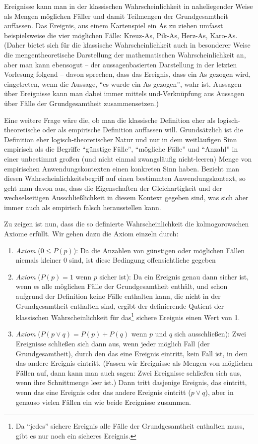 Ereignisse kann man in der klassischen Wahrscheinlichkeit in naheliegender
Weise als Mengen möglichen Fäller und damit Teilmengen der Grundgesamtheit
auffassen. Das Ereignis, aus einem Kartenspiel ein As zu ziehen umfasst
beispielsweise die vier möglichen Fälle: Kreuz-As, Pik-As, Herz-As, Karo-As.
(Daher bietet sich für die klassische Wahrscheinlichkeit auch in besonderer
Weise die mengentheoretische Darstellung der mathematischen Wahrscheinlichkeit
an, aber man kann ebensogut -- der aussagenbasierten Darstellung in der letzten
Vorlesung folgend -- davon sprechen, dass das Ereignis, dass ein As gezogen
wird, eingetreten, wenn die Aussage, "`es wurde ein As gezogen"', wahr ist.
Aussagen über Ereignisse kann man dabei immer mittels und-Verknüpfung aus
Aussagen über Fälle der Grundgesamtheit zusammensetzen.)

Eine weitere Frage wäre die, ob man die klassische Definition eher als
logisch-theoretische oder als empirische Definition auffassen will. Grundsätzlich
ist die Definition eher logisch-theoretischer Natur und nur in dem weitläufigen
Sinn empirisch als die Begriffe "`günstige Fälle"', "`mögliche Fälle"' und
"`Anzahl"' in einer unbestimmt großen (und nicht einmal zwangsläufig
nicht-leeren) Menge von empirischen Anwendungskontexten einen konkreten Sinn
haben. Bezieht man diesen Wahrscheinlichkeitsbegriff auf einen bestimmten
Anwendungskontext, so geht man davon aus, dass die Eigenschaften der
Gleichartigkeit und der wechselseitigen Ausschließlichkeit in diesem Kontext
gegeben sind, was sich aber immer auch als empirisch falsch herausstellen kann.

Zu zeigen ist nun, dass die so definierte Wahrscheinlichkeit die
kolmogorowschen Axiome erfüllt. Wir gehen dazu die Axiom einzeln durch:

\begin{enumerate}
\item {\em Axiom} ($0 \leq P(p)$): Da die Anzahlen von günstigen oder möglichen
Fällen niemals kleiner 0 sind, ist diese Bedingung offensichtliche gegeben
\item {\em Axiom} ($P(p)=1$ wenn $p$ sicher ist): Da ein Ereignis genau dann
sicher ist, wenn es alle möglichen Fälle der Grundgesamtheit enthält, und
schon aufgrund der Definition keine Fälle enthalten kann, die nicht in der
Grundgesamtheit enthalten sind, ergibt der definierende Qutient der klassischen
Wahrscheinlichkeit für das\footnote{Da "`jedes"' sichere Ereignis alle Fälle
der Grundgesamtheit enthalten muss, gibt es nur noch ein sicheres Ereignis.}
sichere Ereignis einen Wert von 1. 
\item {\em Axiom} ($P(p \vee q) = P(p) + P(q)$ wenn $p$ und $q$ sich
ausschließen): Zwei Ereignisse schließen sich dann aus, wenn jeder möglich Fall
(der Grundgesamtheit), durch den das eine Ereignis eintritt, kein Fall ist, in
dem das andere Ereignis eintritt. (Fassen wir Ereignisse als Mengen von
möglichen Fällen auf, dann kann man auch sagen: Zwei Ereignisse schließen sich
aus, wenn ihre Schnittmenge leer ist.) Dann tritt dasjenige Ereignis, das
eintritt, wenn das eine Ereignis oder das andere Ereignis eintritt ($p \vee
q$), aber in genauso vielen Fällen ein wie beide Ereignisse zusammen.
\end{enumerate}

